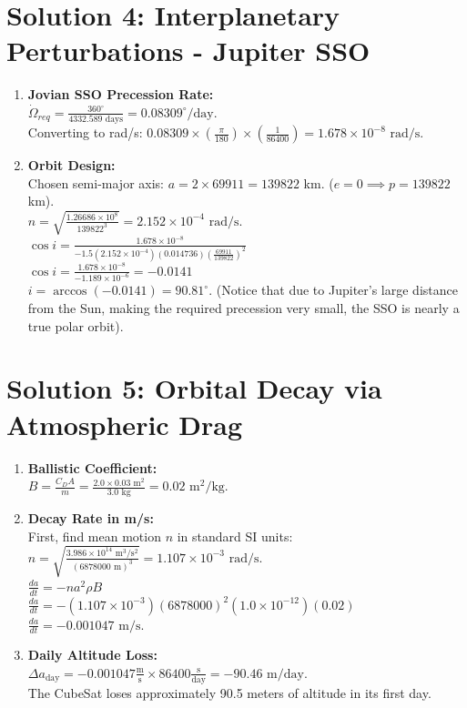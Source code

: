 \documentclass[12pt, letterpaper]{article}
\begin{document}
\section*{Solution 4: Interplanetary Perturbations - Jupiter SSO}
\begin{enumerate}
    \item[a)] \textbf{Jovian SSO Precession Rate:} \\
    $\dot{\Omega}_{req} = \frac{360^\circ}{4332.589 \text{ days}} = 0.08309^\circ/\text{day}$. \\
    Converting to rad/s: $0.08309 \times \left(\frac{\pi}{180}\right) \times \left(\frac{1}{86400}\right) = 1.678 \times 10^{-8} \text{ rad/s}$.
    
    \item[b)] \textbf{Orbit Design:} \\
    Chosen semi-major axis: $a = 2 \times 69911 = 139822$ km. ($e=0 \implies p = 139822$ km). \\
    $n = \sqrt{\frac{1.26686 \times 10^8}{139822^3}} = 2.152 \times 10^{-4} \text{ rad/s}$. \\
    $\cos i = \frac{1.678 \times 10^{-8}}{-1.5 (2.152 \times 10^{-4}) (0.014736) \left(\frac{69911}{139822}\right)^2}$ \\
    $\cos i = \frac{1.678 \times 10^{-8}}{-1.189 \times 10^{-6}} = -0.0141$ \\
    $i = \arccos(-0.0141) = 90.81^\circ$. (Notice that due to Jupiter's large distance from the Sun, making the required precession very small, the SSO is nearly a true polar orbit).
\end{enumerate}

\section*{Solution 5: Orbital Decay via Atmospheric Drag}
\begin{enumerate}
    \item[a)] \textbf{Ballistic Coefficient:} \\
    $B = \frac{C_D A}{m} = \frac{2.0 \times 0.03 \text{ m}^2}{3.0 \text{ kg}} = 0.02 \text{ m}^2/\text{kg}$.
    
    \item[b)] \textbf{Decay Rate in m/s:} \\
    First, find mean motion $n$ in standard SI units: \\
    $n = \sqrt{\frac{3.986 \times 10^{14} \text{ m}^3/\text{s}^2}{(6878000 \text{ m})^3}} = 1.107 \times 10^{-3} \text{ rad/s}$. \\
    $\frac{da}{dt} = -n a^2 \rho B$ \\
    $\frac{da}{dt} = -(1.107 \times 10^{-3})(6878000)^2 (1.0 \times 10^{-12}) (0.02)$ \\
    $\frac{da}{dt} = -0.001047 \text{ m/s}$.
    
    \item[c)] \textbf{Daily Altitude Loss:} \\
    $\Delta a_{\text{day}} = -0.001047 \frac{\text{m}}{\text{s}} \times 86400 \frac{\text{s}}{\text{day}} = -90.46 \text{ m/day}$. \\
    The CubeSat loses approximately 90.5 meters of altitude in its first day.
\end{enumerate}
\end{document}
